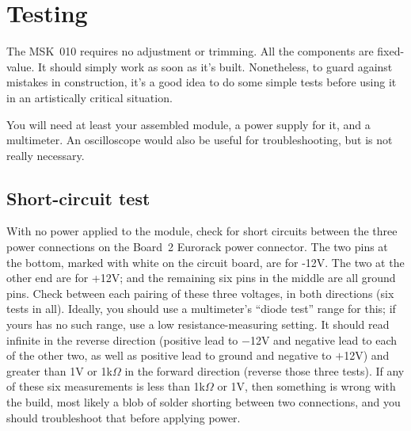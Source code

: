 
%
%
%
%
%
%
\chapter{Testing}

The MSK~010 requires no adjustment or trimming.  All the components are
fixed-value.  It should simply work as soon as it's built.  Nonetheless, to
guard against mistakes in construction, it's a good idea to do some simple
tests before using it in an artistically critical situation.

You will need at least your assembled module, a power supply for it, and a
multimeter.  An oscilloscope would also be useful for troubleshooting, but
is not really necessary.

\section{Short-circuit test}

With no power applied to the module, check for short circuits between the
three power connections on the Board~2 Eurorack power connector.  The two
pins at the bottom, marked with white on the circuit board, are for -12V. 
The two at the other end are for +12V; and the remaining six pins in the
middle are all ground pins.  Check between each pairing of these three
voltages, in both directions (six tests in all).  Ideally, you should use a
multimeter's ``diode test'' range for this; if yours has no such range, use
a low resistance-measuring setting.  It should read infinite in the reverse
direction (positive lead to $-$12V and negative lead to each of the other
two, as well as positive lead to ground and negative to $+$12V) and greater
than 1V or 1k$\Omega$ in the forward direction (reverse those three
tests).  If any of these six measurements is less than 1k$\Omega$ or 1V,
then something is wrong with the build, most likely a blob of solder
shorting between two connections, and you should troubleshoot that before
applying power.

